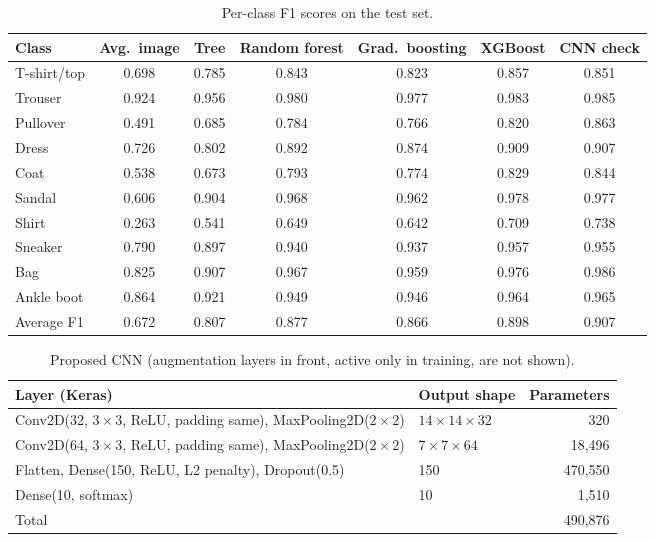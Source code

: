 \documentclass[11pt,a4paper]{article}
\begin{document}
\begin{table}[H]
\centering
\small
\begin{tabular}{lcccccc}
\toprule
Class & Avg.\ image & Tree & Random forest & Grad.\ boosting & XGBoost & CNN check \\
\midrule
T-shirt/top & 0.698 & 0.785 & 0.843 & 0.823 & 0.857 & 0.851 \\
Trouser & 0.924 & 0.956 & 0.980 & 0.977 & 0.983 & 0.985 \\
Pullover & 0.491 & 0.685 & 0.784 & 0.766 & 0.820 & 0.863 \\
Dress & 0.726 & 0.802 & 0.892 & 0.874 & 0.909 & 0.907 \\
Coat & 0.538 & 0.673 & 0.793 & 0.774 & 0.829 & 0.844 \\
Sandal & 0.606 & 0.904 & 0.968 & 0.962 & 0.978 & 0.977 \\
Shirt & 0.263 & 0.541 & 0.649 & 0.642 & 0.709 & 0.738 \\
Sneaker & 0.790 & 0.897 & 0.940 & 0.937 & 0.957 & 0.955 \\
Bag & 0.825 & 0.907 & 0.967 & 0.959 & 0.976 & 0.986 \\
Ankle boot & 0.864 & 0.921 & 0.949 & 0.946 & 0.964 & 0.965 \\
\midrule
Average F1 & 0.672 & 0.807 & 0.877 & 0.866 & 0.898 & 0.907 \\
\bottomrule
\end{tabular}
\caption{Per-class F1 scores on the test set.}
\label{tab:perclass}
\end{table}

\begin{table}[H]
\centering
\small
\begin{tabular}{llr}
\toprule
Layer (Keras) & Output shape & Parameters \\
\midrule
Conv2D(32, $3\times3$, ReLU, padding same), MaxPooling2D($2\times2$) & $14\times14\times32$ & 320 \\
Conv2D(64, $3\times3$, ReLU, padding same), MaxPooling2D($2\times2$) & $7\times7\times64$ & 18{,}496 \\
Flatten, Dense(150, ReLU, L2 penalty), Dropout(0.5) & 150 & 470{,}550 \\
Dense(10, softmax) & 10 & 1{,}510 \\
\midrule
Total & & 490{,}876 \\
\bottomrule
\end{tabular}
\caption{Proposed CNN (augmentation layers in front, active only in training, are not shown).}
\label{tab:cnn}
\end{table}
\end{document}
